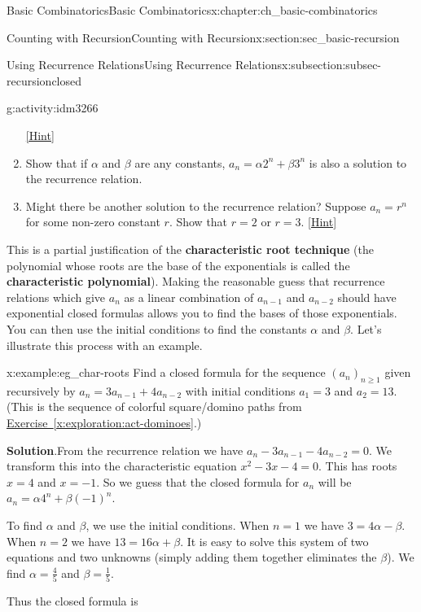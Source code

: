\documentclass[oneside,10pt,]{book}
\newcommand{\terminology}[1]{\textbf{#1}}
\numberwithin{equation}{chapter}
\begin{document}
\begin{chapterptx}{Basic Combinatorics}{}{Basic Combinatorics}{}{}{x:chapter:ch_basic-combinatorics}
\begin{sectionptx}{Counting with Recursion}{}{Counting with Recursion}{}{}{x:section:sec_basic-recursion}
\begin{subsectionptx}{Using Recurrence Relations}{}{Using Recurrence Relations}{}{}{x:subsection:subsec-recursionclosed}
\begin{activity}{}{g:activity:idm3266}
\begin{enumerate}[font=\bfseries,label=(\alph*),ref=\alph*]
\space\hspace*{0pt}\hfill{\tiny\hyperlink{g:hint:idm3275-back}{[Hint]}}\item{}Show that if \(\alpha\) and \(\beta\) are any constants, \(a_n = \alpha 2^n + \beta 3^n\) is also a solution to the recurrence relation.%
\item{}Might there be another solution to the recurrence relation?  Suppose \(a_n = r^n\) for some non-zero constant \(r\).  Show that \(r = 2\) or \(r = 3\).%
\space\hspace*{0pt}\hfill{\tiny\hyperlink{g:hint:idm3290-back}{[Hint]}}\end{enumerate}
\end{activity}
This is a partial justification of the \terminology{characteristic root technique} (the polynomial whose roots are the base of the exponentials is called the \terminology{characteristic polynomial}).  Making the reasonable guess that recurrence relations which give \(a_n\) as a linear combination of \(a_{n-1}\) and \(a_{n-2}\) should have exponential closed formulas allows you to find the bases of those exponentials.  You can then use the initial conditions to find the constants \(\alpha\) and \(\beta\).  Let's illustrate this process with an example.%
\begin{example}{}{x:example:eg_char-roots}%
Find a closed formula for the sequence \((a_n)_{n \ge 1}\) given recursively by \(a_n = 3a_{n-1} + 4a_{n-2}\) with initial conditions \(a_1 = 3\) and \(a_2 = 13\).  (This is the sequence of colorful square\slash{}domino paths from \hyperref[x:exploration:act-dominoes]{Exercise~\ref{x:exploration:act-dominoes}}.)%
\par\smallskip%
\noindent\textbf{Solution}.\hypertarget{g:solution:idm3310}{}\quad{}From the recurrence relation we have \(a_n - 3a_{n-1} - 4a_{n-2} = 0\).  We transform this into the characteristic equation \(x^2 - 3x - 4 = 0\). This has roots \(x = 4\) and \(x = -1\).  So we guess that the closed formula for \(a_n\) will be \(a_n = \alpha 4^n + \beta (-1)^n\).%
\par
To find \(\alpha\) and \(\beta\), we use the initial conditions.   When \(n = 1\) we have \(3 = 4\alpha -\beta\).  When \(n = 2\) we have \(13 = 16\alpha + \beta\).  It is easy to solve this system of two equations and two unknowns (simply adding them together eliminates the \(\beta\)).  We find \(\alpha = \frac{4}{5}\) and \(\beta = \frac{1}{5}\).%
\par
Thus the closed formula is%
\begin{equation*}

\end{equation*}
\end{example}
\end{subsectionptx}
\end{sectionptx}
\end{chapterptx}
\end{document}
